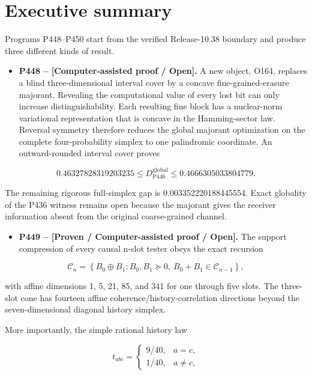 \documentclass[11pt,a4paper,openany]{report}
\begin{document}
\chapter{Executive summary}

Programs P448--P450 start from the verified Release-10.38 boundary and produce three different kinds of result.

\begin{itemize}
\item 
\textbf{P448 -- [Computer-assisted proof /\allowbreak{} Open].} A new object, O164, replaces a blind three-dimensional interval cover by a concave fine-grained-erasure majorant. Revealing the computational value of every lost bit can only increase distinguishability. Each resulting fine block has a nuclear-norm variational representation that is concave in the Hamming-sector law. Reversal symmetry therefore reduces the global majorant optimization on the complete four-probability simplex to one palindromic coordinate. An outward-rounded interval cover proves

\end{itemize}

\[
0.46327828319203235
\le D_{\mathrm{P446}}^{\mathrm{global}}
\le 0.4666305033804779.
\]

The remaining rigorous full-simplex gap is 0.003352220188445554. Exact globality of the P436 witness remains open because the majorant gives the receiver information absent from the original coarse-grained channel.

\begin{itemize}
\item 
\textbf{P449 -- [Proven /\allowbreak{} Computer-assisted proof /\allowbreak{} Open].} The support compression of every causal n-slot tester obeys the exact recursion

\end{itemize}

\[
\mathcal C_n
=\left\{
B_0\oplus B_1:
B_0,B_1\succeq0,
\ B_0+B_1\in\mathcal C_{n-1}
\right\},
\]

with affine dimensions 1, 5, 21, 85, and 341 for one through five slots. The three-slot cone has fourteen affine coherence/\allowbreak{}history-correlation directions beyond the seven-dimensional diagonal history simplex.

More importantly, the simple rational history law

\[
t_{abc}
=\begin{cases}
9/40,&a=c,\\
1/40,&a\ne c,
\end{cases}
\]
\end{document}
